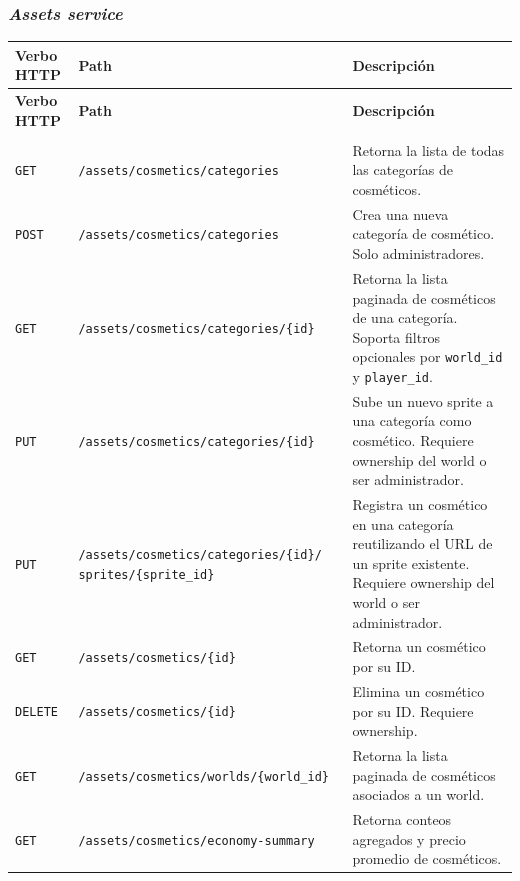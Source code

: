 \subsubsection{\textit{Assets service}}
 
\renewcommand{\arraystretch}{1.4}
\begin{longtable}{|p{2cm}|p{7cm}|p{5.5cm}|}
\hline
\textbf{Verbo HTTP} & \textbf{Path} & \textbf{Descripción} \\
\hline
\endfirsthead
 
\hline
\textbf{Verbo HTTP} & \textbf{Path} & \textbf{Descripción} \\
\hline
\endhead
 
\endfoot
 
\multicolumn{3}{|l|}{\textit{Cosmetics}} \\
\hline
\texttt{GET}    & \texttt{/assets/cosmetics/categories}                          & Retorna la lista de todas las categorías de cosméticos. \\
\hline
\texttt{POST}   & \texttt{/assets/cosmetics/categories}                          & Crea una nueva categoría de cosmético. Solo administradores. \\
\hline
\texttt{GET}    & \texttt{/assets/cosmetics/categories/\{id\}}                   & Retorna la lista paginada de cosméticos de una categoría. Soporta filtros opcionales por \texttt{world\_id} y \texttt{player\_id}. \\
\hline
\texttt{PUT}    & \texttt{/assets/cosmetics/categories/\{id\}}                   & Sube un nuevo sprite a una categoría como cosmético. Requiere ownership del world o ser administrador. \\
\hline
\texttt{PUT}    & \texttt{/assets/cosmetics/categories/\{id\}/} \newline \texttt{sprites/\{sprite\_id\}} & Registra un cosmético en una categoría reutilizando el URL de un sprite existente. Requiere ownership del world o ser administrador. \\
\hline
\texttt{GET}    & \texttt{/assets/cosmetics/\{id\}}                              & Retorna un cosmético por su ID. \\
\hline
\texttt{DELETE} & \texttt{/assets/cosmetics/\{id\}}                              & Elimina un cosmético por su ID. Requiere ownership. \\
\hline
\texttt{GET}    & \texttt{/assets/cosmetics/worlds/\{world\_id\}}                & Retorna la lista paginada de cosméticos asociados a un world. \\
\hline
\texttt{GET}    & \texttt{/assets/cosmetics/economy-summary}                     & Retorna conteos agregados y precio promedio de cosméticos. \\

\end{longtable}
